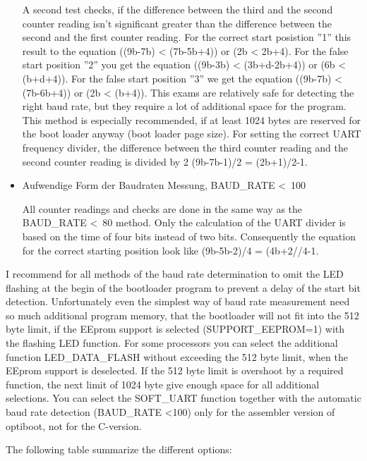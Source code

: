 \begin{itemize}
A second test checks, if the difference between the third and the
second counter reading isn't significant greater than the difference
between the second and the first counter reading.
For the correct start posistion ''1'' this result to the equation ((9b-7b) < (7b-5b+4))
or (2b < 2b+4).
For the false start position ''2'' you get the equation ((9b-3b) < (3b+d-2b+4)) or
(6b < (b+d+4)).
For the false start position ''3'' we get the equation ((9b-7b) < (7b-6b+4)) or (2b < (b+4)).
This exams are relatively safe for detecting the right baud rate, but they
require a lot of additional space for the program.
This method is especially recommended, if at least 1024 bytes are reserved
for the boot loader anyway (boot loader page size).
For setting the correct UART frequency divider, the difference between 
the third counter reading and the second counter reading is divided by 2
(9b-7b-1)/2 = (2b+1)/2-1.

\item {Aufwendige Form der Baudraten Messung, BAUD\_RATE \textless~100}

All counter readings and checks are done in the same way as the
BAUD\_RATE \textless~80 method. Only the calculation of
the UART divider is based on the time of four bits instead of two bits.
Consequently the equation for the correct starting position
look like (9b-5b-2)/4 = (4b+2//4-1.

\end{itemize}

I recommend for all methods of the baud rate determination to omit
the LED flashing at the begin of the bootloader program
to prevent a delay of the start bit detection.
Unfortunately even the simplest way of baud rate measurement
need so much additional program memory, that the bootloader
will not fit into the 512 byte limit, if the EEprom support
is selected (SUPPORT\_EEPROM=1) with the flashing LED function.
For some processors you can select the additional function LED\_DATA\_FLASH
without exceeding the 512 byte limit, when the EEprom support is deselected.
If the 512 byte limit is overshoot by a required function,
the next limit of 1024 byte give enough space for all additional
selections.
You can select the SOFT\_UART function together with the automatic
baud rate detection (BAUD\_RATE \textless 100) only for the
assembler version of optiboot, not for the C-version.

The following table summarize the different options:

